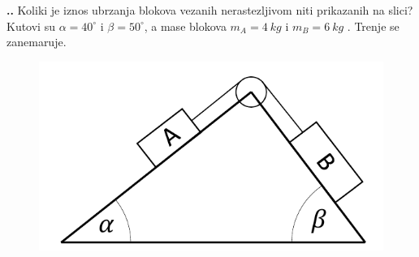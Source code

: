 
\noindent 
\textbf{
\thecjelina.\thezadatak.}
Koliki je iznos ubrzanja blokova vezanih nerastezljivom niti prikazanih na slici? Kutovi su 
$\alpha=40 ^\circ$  i $\beta=50^\circ $, a mase blokova $m_A=4\ kg$ i $m_B=6\ kg$ . Trenje se zanemaruje.

\begin{figure}[ht]%
  \begin{center}
    \includegraphics[scale=0.25]{../03_Dinamika_materijalne_tocke/Zadatak_D707.png}
  \end{center}
\end{figure}

